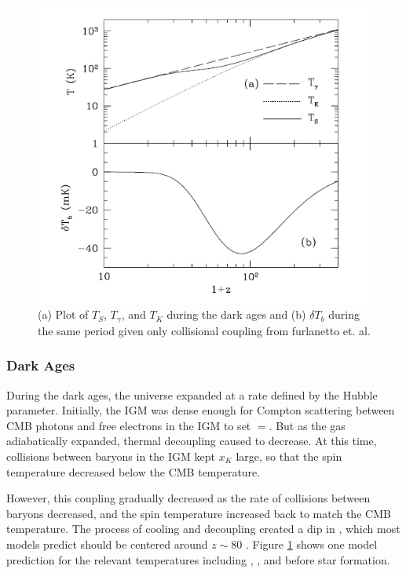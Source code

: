 \begin{figure}[htb]
\begin{center}
\includegraphics[width=0.95\linewidth]{Introduction/figures/dark_ages_global_spectrum.jpg}
\caption{(a) Plot of $T_S$, $T_\gamma$, and $T_K$ during the dark ages and (b) $\delta T_b$ during the same period given only collisional coupling from furlanetto et. al. \cite{furlanetto_2006}}
\label{Fig:da_global}
\end{center}
\end{figure}

\subsubsection{Dark Ages}
During the dark ages, the universe expanded at a rate defined by the Hubble parameter. Initially, the IGM was dense enough for Compton scattering between CMB photons and free electrons in the IGM to set \tk$=$\tg. But as the gas adiabatically expanded, thermal decoupling caused \tk to decrease. At this time, collisions between baryons in the IGM kept $x_K$ large, so that the spin temperature decreased below the CMB temperature. 

However, this coupling gradually decreased as the rate of collisions between baryons decreased, and the spin temperature increased back to match the CMB temperature. The process of cooling and decoupling created a dip in \ts, which most models predict should be centered around $z \sim 80 $ \cite{furlanetto_2006}. Figure \ref{Fig:da_global} shows one model prediction for the relevant temperatures including \tg, \tk, \ts and \dtb before star formation. 

